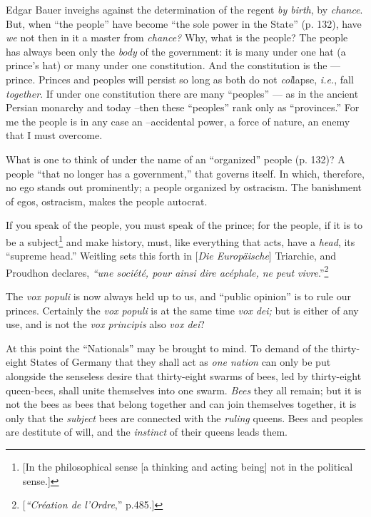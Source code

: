 Edgar Bauer inveighs against the determination of the regent \textit{by 
birth}, by \textit{chance}. But, when ``the people'' have become ``the sole 
power in the State'' (p. 132), have \textit{we} not then in it a master from 
\textit{chance?} Why, what is the people? The people has always been only the 
\textit{body} of the government: it is many under one hat (a prince's hat) or 
many under one constitution. And the constitution is the --- prince. Princes 
and peoples will persist so long as both do not \textit{col}lapse, \textit{i.e.}, 
fall \textit{together}. If under one constitution there are many 
``peoples'' --- as in the ancient Persian monarchy and today --then these 
``peoples'' rank only as ``provinces.'' For me the people is in any case 
an --accidental power, a force of nature, an enemy that I must overcome.

What is one to think of under the name of an ``organized'' people (p. 132)? 
A people ``that no longer has a government,'' that governs itself. In which, 
therefore, no ego stands out prominently; a people organized by ostracism. The 
banishment of egos, ostracism, makes the people autocrat.

If you speak of the people, you must speak of the prince; for the people, if 
it is to be a subject\footnote{[In the philosophical sense [a thinking and 
acting being] not in the political sense.]} and make history, must, like 
everything that acts, have a \textit{head}, its ``supreme head.'' Weitling 
sets this forth in [\textit{Die Europ\"aische}] Triarchie, and Proudhon 
declares, \textit{``une soci\'et\'e, pour ainsi dire ac\'ephale, ne peut 
vivre}.''\footnote{[\textit{``Cr\'eation de l'Ordre},'' p.485.]}

The \textit{vox populi} is now always held up to us, and ``public opinion'' 
is to rule our princes. Certainly the \textit{vox populi} is at the same time 
\textit{vox dei;} but is either of any use, and is not the \textit{vox 
principis} also \textit{vox dei}?

At this point the ``Nationals'' may be brought to mind. To demand of the 
thirty-eight States of Germany that they shall act as \textit{one nation} can 
only be put alongside the senseless desire that thirty-eight swarms of bees, 
led by thirty-eight queen-bees, shall unite themselves into one swarm. 
\textit{Bees} they all remain; but it is not the bees as bees that belong 
together and can join themselves together, it is only that the 
\textit{subject} bees are connected with the \textit{ruling} queens. Bees and 
peoples are destitute of will, and the \textit{instinct} of their queens leads 
them.

